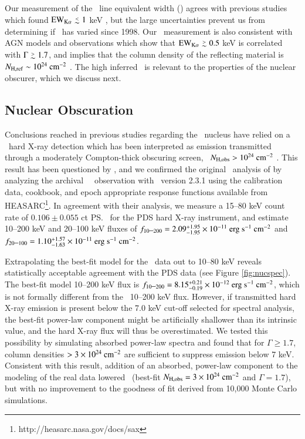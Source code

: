 \documentclass[referee,traditabstract]{aa}
\begin{document}
Our measurement of the \feka\ line equivalent width (\fekaew) agrees
with previous studies which found $\fekaew \la 1$ keV
\citep{2000A&A...353..910F, 2001MNRAS.321L..15I, 2007A&A...473...85P},
but the large uncertainties prevent us from determining if
\fekaew\ has varied since 1998. Our \fekaew\ measurement is also
consistent with AGN models and observations which show that $\fekaew
\ga 0.5$ keV is correlated with $\Gamma \ga 1.7$, and implies that the
column density of the reflecting material is $N_{\rm{H,ref}} \sim 10^{24}
~\mbox{\ensuremath{\rm{cm^{-2}}}}$ \citep{1996MNRAS.280..823M, 1997ApJ...477..602N,
  1999MNRAS.303L..11Z, 2000PASP..112.1145F, 2005A&A...444..119G}. The
high inferred \nhref\ is relevant to the properties of the nuclear
obscurer, which we discuss next.

\subsection{Nuclear Obscuration}

Conclusions reached in previous studies regarding the \irs\ nucleus
have relied on a \bepposax\ hard X-ray detection which has been
interpreted as emission transmitted through a moderately Compton-thick
obscuring screen, \ie\ $N_{\rm{H,obs}} > 10^{24} ~\mbox{\ensuremath{\rm{cm^{-2}}}}$
\citep{2000A&A...353..910F, 2001MNRAS.321L..15I}. This result has been
questioned by \citet{2007A&A...473...85P}, and we confirmed the
original \bepposax\ analysis of \citet{2000A&A...353..910F} by
analyzing the archival \bepposax\ \irs\ observation with
\saxdas\ version 2.3.1 using the calibration data, cookbook, and epoch
appropriate response functions available from
HEASARC\footnote{http://heasarc.nasa.gov/docs/sax}. In agreement with
their analysis, we measure a 15--80 keV count rate of $0.106 \pm
0.055$ ct \ps\ for the PDS hard X-ray instrument, and estimate 10--200
keV and 20--100 keV fluxes of $f_{10 \mbox{--} 200} = 2.09^{+1.95}_{-1.95}
\times 10^{-11} ~\rm{\mbox{\ensuremath{\rm{erg}}}~\ensuremath{\rm{\mbox{\ensuremath{\rm{s}}}^{-1}}}~\mbox{\ensuremath{\rm{cm^{-2}}}}}$ and $f_{20 \mbox{--} 100} = 1.10^{+1.57}_{-1.63}
\times 10^{-11} ~\rm{\mbox{\ensuremath{\rm{erg}}}~\ensuremath{\rm{\mbox{\ensuremath{\rm{s}}}^{-1}}}~\mbox{\ensuremath{\rm{cm^{-2}}}}}$.

Extrapolating the best-fit model for the \cxo\ data out to 10--80 keV
reveals statistically acceptable agreement with the PDS data (see
Figure \ref{fig:nucspec}). The best-fit model 10--200 keV flux is $f_{10
  \mbox{--} 200} = 8.15^{+0.21}_{-0.19} \times 10^{-12} ~\rm{\mbox{\ensuremath{\rm{erg}}}~\ensuremath{\rm{\mbox{\ensuremath{\rm{s}}}^{-1}}}~\mbox{\ensuremath{\rm{cm^{-2}}}}}$, which is
not formally different from the \bepposax\ 10--200 keV flux. However,
if transmitted hard X-ray emission is present below the 7.0 keV
cut-off selected for spectral analysis, the best-fit power-law
component might be artificially shallower than its intrinsic value, and
the hard X-ray flux will thus be overestimated. We tested this
possibility by simulating absorbed power-law spectra and found that
for $\Gamma \ge 1.7$, column densities $> 3 \times 10^{24} ~\mbox{\ensuremath{\rm{cm^{-2}}}}$
are sufficient to suppress emission below 7 keV. Consistent with this
result, addition of an absorbed, power-law component to the modeling
of the real data lowered \chisq\ (best-fit $N_{\rm{H,obs}} = 3 \times 10^{24}
~\mbox{\ensuremath{\rm{cm^{-2}}}}$ and $\Gamma = 1.7$), but with no improvement to the goodness
of fit derived from 10,000 Monte Carlo simulations.
\end{document}
